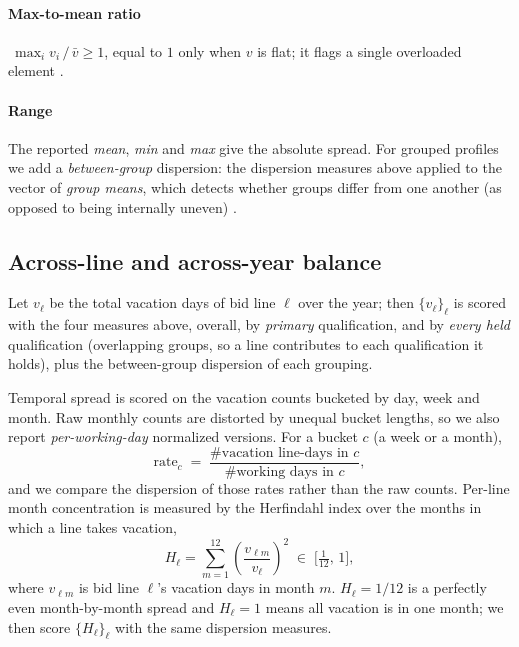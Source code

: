 \documentclass[preprint,12pt]{elsarticle}
\begin{document}
   \paragraph{Max-to-mean ratio} $\ \max_i v_i \,/\, \bar v \ge 1$, equal to $1$ only when $v$ is flat; it flags a single overloaded element \citep{allison1978measures}.

   \paragraph{Range} The reported \emph{mean}, \emph{min} and \emph{max} give the absolute spread. For grouped profiles we add a \emph{between-group} dispersion: the dispersion measures above applied to the vector of \emph{group means}, which detects whether groups differ from one another (as opposed to being internally uneven) \citep{cowell2011measuring}.

   \subsection{Across-line and across-year balance} \label{subsec:across_line_year}
   Let $v_\ell$ be the total vacation days of bid line $\ell$ over the year; then $\{v_\ell\}_\ell$ is scored with the four measures above, overall, by \emph{primary} qualification, and by \emph{every held} qualification (overlapping groups, so a line contributes to each qualification it holds), plus the between-group dispersion of each grouping.

   Temporal spread is scored on the vacation counts bucketed by day, week and month. Raw monthly counts are distorted by unequal bucket lengths, so we also report \emph{per-working-day} normalized versions. For a bucket $c$ (a week or a month),
   \begin{equation}
      \mathrm{rate}_c \;=\;
      \frac{\#\text{vacation line-days in } c}{\#\text{working days in } c},
   \end{equation}
   and we compare the dispersion of those rates rather than the raw counts. Per-line month concentration is measured by the Herfindahl index \citep{hirschman1945national,herfindahl1950concentration,rhoades1993herfindahl} over the months in which a line takes vacation,
   \begin{equation}
      H_\ell = \sum\limits_{m=1}^{12}\left(\frac{v_{\ell m}}{v_\ell}\right)^{2}
            \;\in\; \Big[\tfrac1{12},\,1\Big],
   \end{equation}
   where $v_{\ell m}$ is bid line $\ell$'s vacation days in month $m$. $H_\ell = 1/12$ is a perfectly even month-by-month spread and $H_\ell = 1$ means all vacation is in one month; we then score $\{H_\ell\}_\ell$ with the same dispersion measures.
\end{document}
